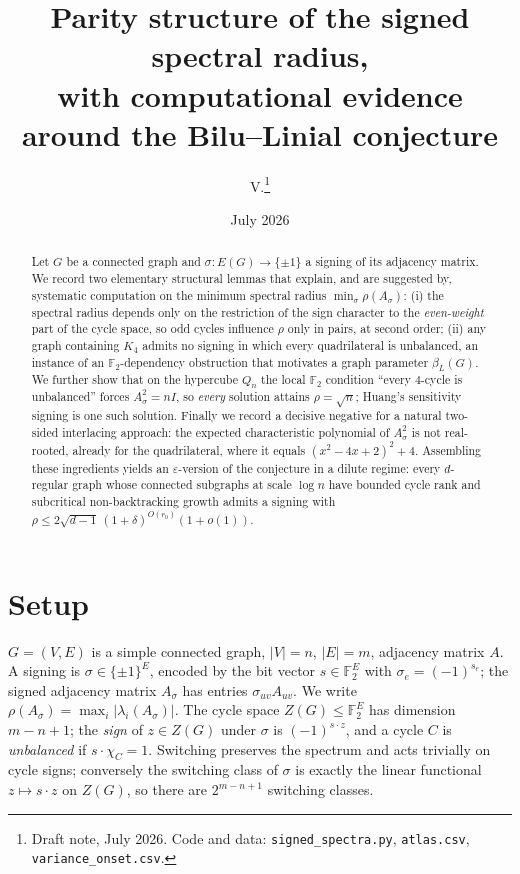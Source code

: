 \documentclass[11pt]{article}
\title{Parity structure of the signed spectral radius,\\
with computational evidence around the Bilu--Linial conjecture}
\author{V.\thanks{Draft note, July 2026. Code and data:
\texttt{signed\_spectra.py}, \texttt{atlas.csv}, \texttt{variance\_onset.csv}.}}
\date{July 2026}
\theoremstyle{remark}
\newcommand{\F}{\mathbb{F}}
\newcommand{\rhomax}{\rho}
\begin{document}
\maketitle

\begin{abstract}
Let $G$ be a connected graph and $\sigma\colon E(G)\to\{\pm1\}$ a signing of
its adjacency matrix. We record two elementary structural lemmas that
explain, and are suggested by, systematic computation on the minimum
spectral radius $\min_\sigma \rhomax(A_\sigma)$: (i) the spectral radius
depends only on the restriction of the sign character to the
\emph{even-weight} part of the cycle space, so odd cycles influence
$\rhomax$ only in pairs, at second order; (ii) any graph containing $K_4$
admits no signing in which every quadrilateral is unbalanced, an instance
of an $\F_2$-dependency obstruction that motivates a graph parameter
$\beta_L(G)$. We further show that on the hypercube $Q_n$ the local
$\F_2$ condition ``every $4$-cycle is unbalanced'' forces $A_\sigma^2=nI$,
so \emph{every} solution attains $\rhomax=\sqrt n$; Huang's sensitivity
signing is one such solution. Finally we record a decisive negative for a
natural two-sided interlacing approach: the expected characteristic
polynomial of $A_\sigma^2$ is not real-rooted, already for the
quadrilateral, where it equals $(x^2-4x+2)^2+4$. Assembling these
ingredients yields an $\varepsilon$-version of the conjecture in a
dilute regime: every $d$-regular graph whose connected subgraphs at
scale $\log n$ have bounded cycle rank and subcritical
non-backtracking growth admits a signing with
$\rho\le2\sqrt{d-1}\,(1+\delta)^{O(r_0)}(1+o(1))$.
\end{abstract}

\section{Setup}

$G=(V,E)$ is a simple connected graph, $|V|=n$, $|E|=m$, adjacency matrix
$A$. A signing is $\sigma\in\{\pm1\}^E$, encoded by the bit vector
$s\in\F_2^E$ with $\sigma_e=(-1)^{s_e}$; the signed adjacency matrix
$A_\sigma$ has entries $\sigma_{uv}A_{uv}$. We write
$\rhomax(A_\sigma)=\max_i|\lambda_i(A_\sigma)|$. The cycle space
$Z(G)\le\F_2^E$ has dimension $m-n+1$; the \emph{sign} of $z\in Z(G)$
under $\sigma$ is $(-1)^{s\cdot z}$, and a cycle $C$ is \emph{unbalanced}
if $s\cdot\chi_C=1$. Switching preserves the spectrum and acts trivially
on cycle signs; conversely the switching class of $\sigma$ is exactly the
linear functional $z\mapsto s\cdot z$ on $Z(G)$, so there are
$2^{m-n+1}$ switching classes.
\end{document}
